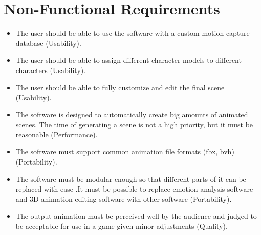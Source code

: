 \section{Non-Functional Requirements}

\begin{itemize}
\item The user should be able to use the software with a custom motion-capture database (Usability).
\item The user should be able to assign different character models to different characters (Usability).
\item The user should be able to fully customize and edit the final scene (Usability).
\item The software is designed to automatically create big amounts of animated scenes. The time of generating a scene is not a high priority, but it must be reasonable (Performance).
\item The software must support common animation file formats (fbx, bvh) (Portability).
\item The software must be modular enough so that different parts of it can be replaced with ease .It must be possible to replace emotion analysis software and 3D animation editing software with other software (Portability).
\item The output animation must be perceived well by the audience and judged to be acceptable for use in a game given minor adjustments (Quality).
\end{itemize}
